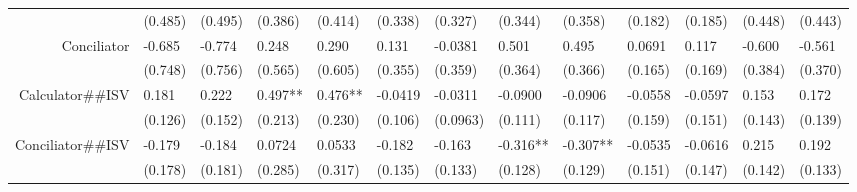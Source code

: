 \begin{tabular}{rrrrrrrrrrrrr}
      & \multicolumn{1}{l}{(0.485)} & \multicolumn{1}{l}{(0.495)} & \multicolumn{1}{l}{(0.386)} & \multicolumn{1}{l}{(0.414)} & \multicolumn{1}{l}{(0.338)} & \multicolumn{1}{l}{(0.327)} & \multicolumn{1}{l}{(0.344)} & \multicolumn{1}{l}{(0.358)} & \multicolumn{1}{l}{(0.182)} & \multicolumn{1}{l}{(0.185)} & \multicolumn{1}{l}{(0.448)} & \multicolumn{1}{l}{(0.443)} \\
Conciliator & \multicolumn{1}{l}{-0.685} & \multicolumn{1}{l}{-0.774} & \multicolumn{1}{l}{0.248} & \multicolumn{1}{l}{0.290} & \multicolumn{1}{l}{0.131} & \multicolumn{1}{l}{-0.0381} & \multicolumn{1}{l}{0.501} & \multicolumn{1}{l}{0.495} & \multicolumn{1}{l}{0.0691} & \multicolumn{1}{l}{0.117} & \multicolumn{1}{l}{-0.600} & \multicolumn{1}{l}{-0.561} \\
      & \multicolumn{1}{l}{(0.748)} & \multicolumn{1}{l}{(0.756)} & \multicolumn{1}{l}{(0.565)} & \multicolumn{1}{l}{(0.605)} & \multicolumn{1}{l}{(0.355)} & \multicolumn{1}{l}{(0.359)} & \multicolumn{1}{l}{(0.364)} & \multicolumn{1}{l}{(0.366)} & \multicolumn{1}{l}{(0.165)} & \multicolumn{1}{l}{(0.169)} & \multicolumn{1}{l}{(0.384)} & \multicolumn{1}{l}{(0.370)} \\
Calculator\#\#ISV & \multicolumn{1}{l}{0.181} & \multicolumn{1}{l}{0.222} & \multicolumn{1}{l}{0.497**} & \multicolumn{1}{l}{0.476**} & \multicolumn{1}{l}{-0.0419} & \multicolumn{1}{l}{-0.0311} & \multicolumn{1}{l}{-0.0900} & \multicolumn{1}{l}{-0.0906} & \multicolumn{1}{l}{-0.0558} & \multicolumn{1}{l}{-0.0597} & \multicolumn{1}{l}{0.153} & \multicolumn{1}{l}{0.172} \\
      & \multicolumn{1}{l}{(0.126)} & \multicolumn{1}{l}{(0.152)} & \multicolumn{1}{l}{(0.213)} & \multicolumn{1}{l}{(0.230)} & \multicolumn{1}{l}{(0.106)} & \multicolumn{1}{l}{(0.0963)} & \multicolumn{1}{l}{(0.111)} & \multicolumn{1}{l}{(0.117)} & \multicolumn{1}{l}{(0.159)} & \multicolumn{1}{l}{(0.151)} & \multicolumn{1}{l}{(0.143)} & \multicolumn{1}{l}{(0.139)} \\
Conciliator\#\#ISV & \multicolumn{1}{l}{-0.179} & \multicolumn{1}{l}{-0.184} & \multicolumn{1}{l}{0.0724} & \multicolumn{1}{l}{0.0533} & \multicolumn{1}{l}{-0.182} & \multicolumn{1}{l}{-0.163} & \multicolumn{1}{l}{-0.316**} & \multicolumn{1}{l}{-0.307**} & \multicolumn{1}{l}{-0.0535} & \multicolumn{1}{l}{-0.0616} & \multicolumn{1}{l}{0.215} & \multicolumn{1}{l}{0.192} \\
      & \multicolumn{1}{l}{(0.178)} & \multicolumn{1}{l}{(0.181)} & \multicolumn{1}{l}{(0.285)} & \multicolumn{1}{l}{(0.317)} & \multicolumn{1}{l}{(0.135)} & \multicolumn{1}{l}{(0.133)} & \multicolumn{1}{l}{(0.128)} & \multicolumn{1}{l}{(0.129)} & \multicolumn{1}{l}{(0.151)} & \multicolumn{1}{l}{(0.147)} & \multicolumn{1}{l}{(0.142)} & \multicolumn{1}{l}{(0.133)} \\

\end{tabular}
